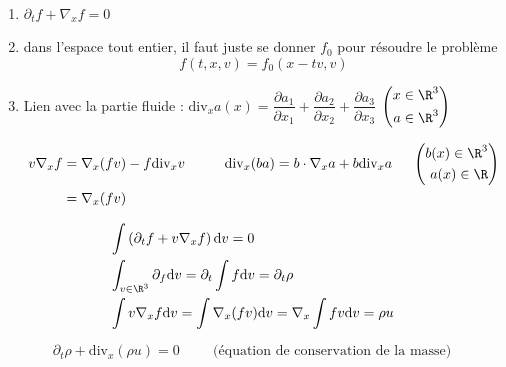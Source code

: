 \documentclass[12pt,a4paper]{article}
\begin{document}
\begin{rmq}$ $
		\begin{enumerate}[label=$\to$]
			\item $\partial_t f + \nabla_x f = 0$
			\item dans l'espace tout entier, il faut juste se donner $f_0$ pour résoudre le problème
			\[
			f(t,x,v) = f_0(x-tv,v)
			\]
			
			\item Lien avec la partie fluide : $ \mathrm{div}_x a(x)= \dfrac{\partial a_1}{\partial x_1} +\dfrac{\partial a_2}{\partial x_2} +\dfrac{\partial a_3}{\partial x_3}$ \hspace{1cm} $\left(\begin{aligned}
				x \in \R^3 \\
				a \in \R^3
			\end{aligned}\right)$
			
			\[
			\begin{aligned}
				v\nabla_x f &= \nabla_x(fv) - f\mathrm{div}_x v \hspace{1cm} \mathrm{div}_x(ba) = b\cdot \nabla_x a + b\mathrm{div}_x a \hspace{.5cm} \left(\begin{aligned}
					b(x) \in \R^3 \\
					a(x) \in \R
				\end{aligned}\right)\\
				&= \nabla_x(fv)
			\end{aligned}
			\]
		\end{enumerate}
\end{rmq}

\[
\begin{aligned}
	&\displaystyle\int \left(\partial_t f + v\nabla_x f\right)\mathrm{d}v = 0 \\
	&\int_{v \in \R^3} \partial_ f \mathrm{d}v = \partial_t \int f \mathrm dv =  \partial_t\rho \\
	&\int v\nabla_x f \mathrm dv = \int \nabla_x(fv) \mathrm dv = \nabla_x \int fv \mathrm dv = \rho u
\end{aligned}
\]

\[
\partial_t \rho + \mathrm{div}_x(\rho u) = 0 \hspace{1cm} \text{(équation de conservation de la masse)}
\]
\end{document}
